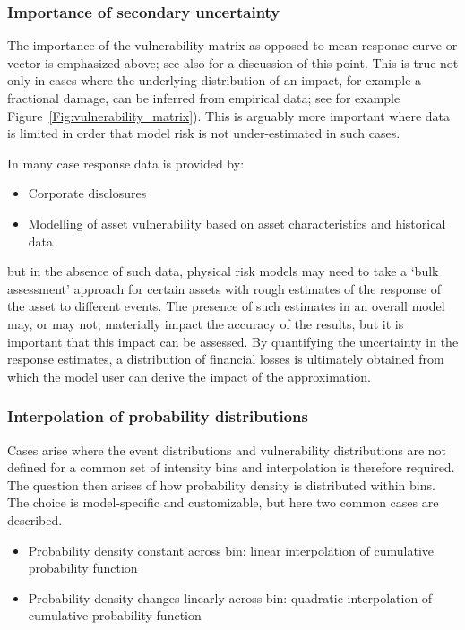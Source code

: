 \documentclass[a4paper,11pt]{extarticle} %
\begin{document}
\subsubsection{Importance of secondary uncertainty}
The importance of the vulnerability matrix as opposed to mean response curve or vector is emphasized above; see also \cite{Taylor:2015} for a discussion of this point. This is true not only in cases where the underlying distribution of an impact, for example a fractional damage, can be inferred from empirical data; see for example Figure~\ref{Fig:vulnerability_matrix}). This is arguably more important where data is limited in order that model risk is not under-estimated in such cases. 

In many case response data is provided by:
\begin{itemize}
	\item Corporate disclosures
	\item Modelling of asset vulnerability based on asset characteristics and historical data
\end{itemize}
but in the absence of such data, physical risk models may need to take a `bulk assessment' approach for certain assets with rough estimates of the response of the asset to different events. The presence of such estimates in an overall model may, or may not, materially impact the accuracy of the results, but it is important that this impact can be assessed. By quantifying the uncertainty in the response estimates, a distribution of financial losses is ultimately obtained from which the model user can derive the impact of the approximation.   

\subsubsection{Interpolation of probability distributions}
Cases arise where the event distributions and vulnerability distributions are not defined for a common set of intensity bins and interpolation is therefore required. The question then arises of how probability density is distributed within bins. The choice is model-specific and customizable, but here two common cases are described.

\begin{itemize}
	\item Probability density constant across bin: linear interpolation of cumulative probability function
	\item Probability density changes linearly across bin: quadratic interpolation of cumulative probability function
\end{itemize}
\end{document}
